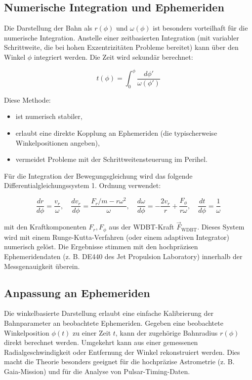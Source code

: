 \subsection{Numerische Integration und Ephemeriden}
\label{sub:weber_numerik}

Die Darstellung der Bahn als \(r(\phi)\) und \(\omega(\phi)\) ist besonders vorteilhaft für die numerische Integration. Anstelle einer zeitbasierten Integration (mit variabler Schrittweite, die bei hohen Exzentrizitäten Probleme bereitet) kann über den Winkel \(\phi\) integriert werden. Die Zeit wird sekundär berechnet:

\[
t(\phi) = \int_0^\phi \frac{d\phi'}{\omega(\phi')}
\]

Diese Methode:
\begin{itemize}
    \item ist numerisch stabiler,
    \item erlaubt eine direkte Kopplung an Ephemeriden (die typischerweise Winkelpositionen angeben),
    \item vermeidet Probleme mit der Schrittweitensteuerung im Perihel.
\end{itemize}

Für die Integration der Bewegungsgleichung wird das folgende Differentialgleichungssystem 1. Ordnung verwendet:

\[
\frac{dr}{d\phi} = \frac{v_r}{\omega}, \quad
\frac{dv_r}{d\phi} = \frac{F_r/m - r\omega^2}{\omega}, \quad
\frac{d\omega}{d\phi} = -\frac{2v_r}{r} + \frac{F_\phi}{r\omega}, \quad
\frac{dt}{d\phi} = \frac{1}{\omega}
\]

mit den Kraftkomponenten \(F_r, F_\phi\) aus der WDBT-Kraft \(\vec{F}_{\text{WDBT}}\). Dieses System wird mit einem Runge-Kutta-Verfahren (oder einem adaptiven Integrator) numerisch gelöst. Die Ergebnisse stimmen mit den hochpräzisen Ephemeridendaten (z. B. DE440 des Jet Propulsion Laboratory) innerhalb der Messgenauigkeit überein.

\subsection{Anpassung an Ephemeriden}
\label{sub:weber_ephemeriden}

Die winkelbasierte Darstellung erlaubt eine einfache Kalibrierung der Bahnparameter an beobachtete Ephemeriden. Gegeben eine beobachtete Winkelposition \(\phi(t)\) zu einer Zeit \(t\), kann der zugehörige Bahnradius \(r(\phi)\) direkt berechnet werden. Umgekehrt kann aus einer gemessenen Radialgeschwindigkeit oder Entfernung der Winkel rekonstruiert werden. Dies macht die Theorie besonders geeignet für die hochpräzise Astrometrie (z. B. Gaia-Mission) und für die Analyse von Pulsar-Timing-Daten.

